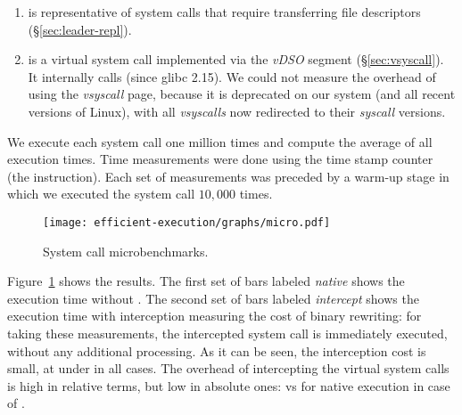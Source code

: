 \begin{enumerate}
\item {} is representative of system calls that
  require transferring file descriptors (\S\ref{sec:leader-repl}).

\item {} is a virtual system call implemented via the
  \textit{vDSO} segment (\S\ref{sec:vsyscall}). It internally calls
   (since glibc 2.15).  We could not measure
  the overhead of using the \textit{vsyscall} page, because it is
  deprecated on our system (and all recent versions of Linux), with
  all \textit{vsyscalls} now redirected to their \textit{syscall}
  versions.

\end{enumerate}


We execute each system call one million times and compute the average
of all execution times.  Time measurements were done using the time
stamp counter (\ie the  instruction). Each set of
measurements was preceded by a warm-up stage in which we executed the
system call $10,000$ times. %

\begin{figure}[!t]
  \centering
  \texttt{[image: efficient-execution/graphs/micro.pdf]}
  \caption{System call microbenchmarks.}
  \label{fig:micro_syscall}
\end{figure}


Figure~\ref{fig:micro_syscall} shows the results.  The first set of bars
labeled \textit{native} shows the execution time without \nx.  The second set
of bars labeled \textit{intercept} shows the execution time with interception
measuring the cost of binary rewriting: for taking these measurements, the
intercepted system call is immediately executed, without any additional
processing.  As it can be seen, the interception cost is small, at under
\maxInterceptOvh in all cases. The overhead of intercepting the virtual system
calls is high in relative terms, but low in absolute ones: \vdsoIntercept vs
\vdsoNative for native execution in case of .

